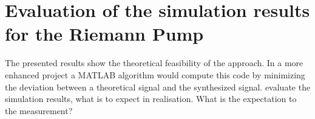 \section{Evaluation of the simulation results for the Riemann Pump}
 The presented results show the theoretical feasibility of the approach.
 In a more enhanced project a MATLAB algorithm would compute this code by minimizing the deviation between a theoretical signal and the synthesized signal.
evaluate the simulation results, what is to expect in realisation. 
What is the expectation to the measurement?
